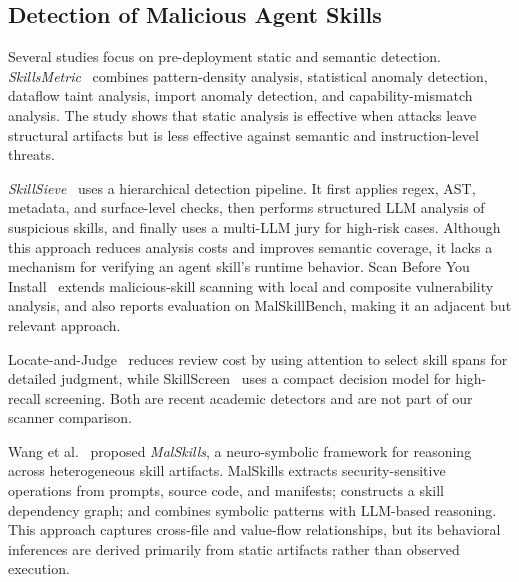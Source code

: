


\subsection{Detection of Malicious Agent Skills}
Several studies focus on pre-deployment static and semantic detection. \textit{SkillsMetric}~\cite{chenskillsmetric} combines pattern-density analysis, statistical anomaly detection, dataflow taint analysis, import anomaly detection, and capability-mismatch analysis. The study shows that static analysis is effective when attacks leave structural artifacts but is less effective against semantic and instruction-level threats. 

\textit{SkillSieve}~\cite{hou2026skillsieve} uses a hierarchical detection pipeline. It first applies regex, AST, metadata, and surface-level checks, then performs structured LLM analysis of suspicious skills, and finally uses a multi-LLM jury for high-risk cases. Although this approach reduces analysis costs and improves semantic coverage, it lacks a mechanism for verifying an agent skill's runtime behavior.
Scan Before You Install~\cite{gandhi2026scanbeforeinstall} extends malicious-skill scanning with local and composite vulnerability analysis, and also reports evaluation on MalSkillBench, making it an adjacent but relevant approach.

Locate-and-Judge~\cite{etteib2026locatejudge} reduces review cost by using attention to select skill spans for detailed judgment, while SkillScreen~\cite{huang2026skillscreen} uses a compact decision model for high-recall screening. Both are recent academic detectors and are not part of our scanner comparison.

Wang et al.~\cite{wang2026elementary} proposed \textit{MalSkills}, a neuro-symbolic framework for reasoning across heterogeneous skill artifacts. MalSkills extracts security-sensitive operations from prompts, source code, and manifests; constructs a skill dependency graph; and combines symbolic patterns with LLM-based reasoning. This approach captures cross-file and value-flow relationships, but its behavioral inferences are derived primarily from static artifacts rather than observed execution.

